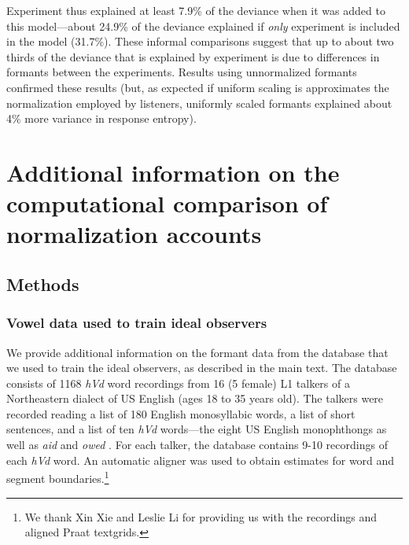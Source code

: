 \documentclass[preprint]{JASA}
\begin{document}
Experiment thus explained at least 7.9\% of the deviance when it was added to this model---about 24.9\% of the deviance explained if \emph{only} experiment is included in the model (31.7\%). These informal comparisons suggest that up to about two thirds of the deviance that is explained by experiment is due to differences in formants between the experiments.
Results using unnormalized formants confirmed these results (but, as expected if uniform scaling is approximates the normalization employed by listeners, uniformly scaled formants explained about 4\% more variance in response entropy).

\section{Additional information on the computational comparison of normalization accounts}\label{additional-information-on-the-computational-comparison-of-normalization-accounts}

\subsection{Methods}\label{methods-1}

\subsubsection{\texorpdfstring{Vowel data used to train ideal observers \citep{xie-jaeger2020}}{Vowel data used to train ideal observers {[}@xie-jaeger2020{]}}}\label{sec:SI-xie-jaeger}

We provide additional information on the formant data from the \citet{xie-jaeger2020} database that we used to train the ideal observers, as described in the main text. The database consists of 1168 \emph{hVd} word recordings from 16 (5 female) L1 talkers of a Northeastern dialect of US English (ages 18 to 35 years old). The talkers were recorded reading a list of 180 English monosyllabic words, a list of short sentences, and a list of ten \emph{hVd} words---the eight US English monophthongs as well as \emph{aid} and \emph{owed} \citep[for further information, see][]{xie-jaeger2020}. For each talker, the database contains 9-10 recordings of each \emph{hVd} word. An automatic aligner \citep[Penn Phonetics Lab Forced Aligner,][]{yuan2008} was used to obtain estimates for word and segment boundaries.\footnote{We thank Xin Xie and Leslie Li for providing us with the recordings and aligned Praat textgrids.}
\end{document}
